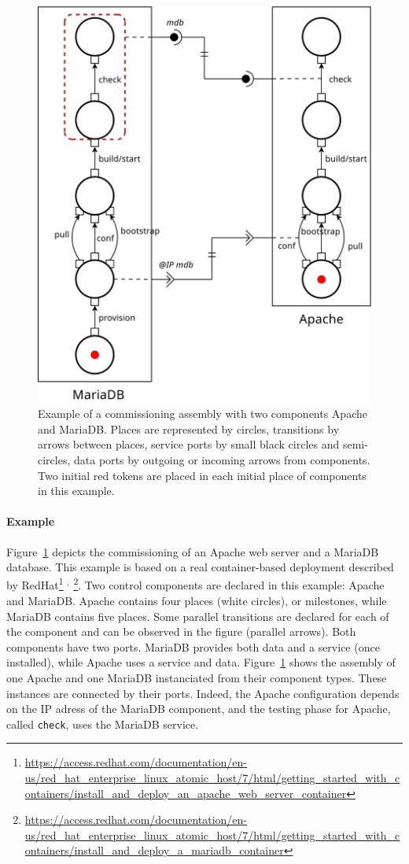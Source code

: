 \begin{figure}[tbp]
  \begin{center}
    \includegraphics[width=0.7\linewidth]{./images/apachebdd.pdf}
  \end{center}
  \caption{Example of a commissioning assembly with two components
    Apache and MariaDB. Places are represented by circles, transitions
    by arrows between places, service ports by small black circles and
    semi-circles, data ports by outgoing or incoming arrows from
    components. Two initial red tokens are placed in each initial
    place of components in this example.}
  \label{fig:example}
\end{figure}

\paragraph{Example}{ Figure~\ref{fig:example} depicts the \mad
  commissioning of an Apache web server and a MariaDB database. This
  example is based on a real container-based deployment described by
  RedHat\footnote{\url{https://access.redhat.com/documentation/en-us/red_hat_enterprise_linux_atomic_host/7/html/getting_started_with_containers/install_and_deploy_an_apache_web_server_container}}%
  $^,$%
  \footnote{\url{https://access.redhat.com/documentation/en-us/red_hat_enterprise_linux_atomic_host/7/html/getting_started_with_containers/install_and_deploy_a_mariadb_container}}. Two
  \mad control components are declared in this example: Apache and
  MariaDB. Apache contains four places (white circles), or
  milestones, while MariaDB contains five places. Some parallel
  transitions are declared for each of the component and can be
  observed in the figure (parallel arrows). Both components have two
  ports. MariaDB provides both data and a service (once installed),
  while Apache uses a service and data. Figure~\ref{fig:example}
  shows the assembly of one Apache and one MariaDB instanciated from
  their component types. These instances are connected by their
  ports. Indeed, the Apache configuration depends on the IP adress of the
  MariaDB component, and the testing phase for Apache, called
  \texttt{check}, uses the MariaDB service.}

